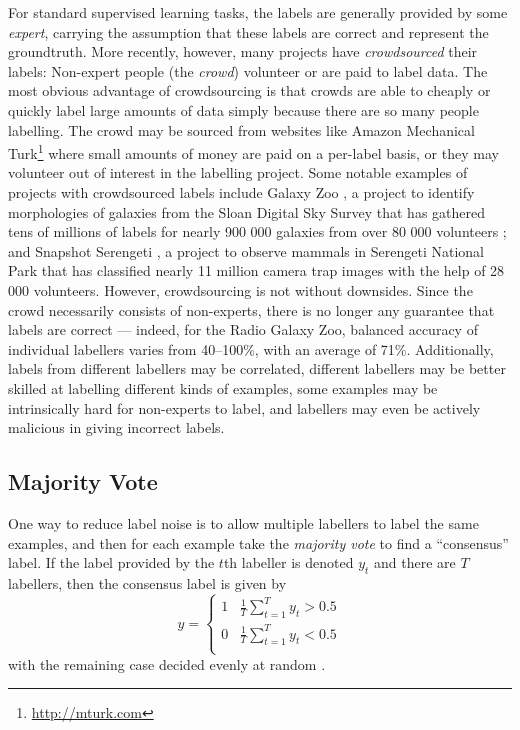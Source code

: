         For standard supervised learning tasks, the labels are generally
        provided by some \emph{expert}, carrying the assumption that these
        labels are correct and represent the groundtruth. More recently,
        however, many projects have
        \emph{crowdsourced} their labels: Non-expert people (the \emph{crowd})
        volunteer or are paid to label data. The most obvious advantage of
        crowdsourcing is that crowds are able to cheaply or quickly label large
        amounts of data simply because there are so many people labelling. The
        crowd may be sourced from websites like Amazon Mechanical
        Turk\footnote{\url{http://mturk.com}} where small amounts of money are
        paid on a per-label basis, or they may volunteer out of interest in the
        labelling project. Some notable examples of projects with crowdsourced
        labels include Galaxy Zoo \citep{lintott08}, a project to identify
        morphologies of galaxies from the Sloan Digital Sky Survey that has
        gathered tens of millions of labels for nearly 900 000 galaxies from
        over 80 000 volunteers
        \citep{lintott11}; and Snapshot Serengeti \citep{swanson15}, a project to
        observe mammals in Serengeti National Park that has classified nearly
        11 million camera trap images with the help of 28 000 volunteers.
        However, crowdsourcing is not without downsides. Since the crowd
        necessarily consists of non-experts, there is no longer any guarantee
        that labels are correct --- indeed, for the Radio Galaxy Zoo, balanced
        accuracy of individual labellers varies from 40--100\%, with an average
        of 71\%. Additionally, labels from different labellers may be
        correlated, different labellers may be better skilled at labelling
        different kinds of examples, some examples may be intrinsically hard
        for non-experts to label, and labellers may even be actively malicious
        in giving incorrect labels.

    \subsection{Majority Vote}
    \label{sec:majority-vote}

        One way to reduce label noise is to allow multiple labellers to label the same examples, and then for each example take the \emph{majority vote} to find a ``consensus'' label. If the label provided by the $t$th labeller is denoted $y_t$ and there are $T$ labellers, then the consensus label is given by
        \begin{equation*}
            y = \begin{cases}
                1 & \frac{1}{T} \sum_{t = 1}^T y_t > 0.5\\
                0 & \frac{1}{T} \sum_{t = 1}^T y_t < 0.5\\
            \end{cases}
        \end{equation*}
        with the remaining case decided evenly at random \citep{raykar10}.

